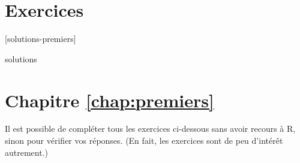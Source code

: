 \section{Exercices}
\label{sec:premiers:exercices}

[solutions-premiers]

\begin{Filesave}{solutions}
\section*{Chapitre \ref*{chap:premiers}}

\end{Filesave}

Il est possible de compléter tous les exercices ci-dessous sans avoir
recours à R, sinon pour vérifier vos réponses. (En fait, les exercices
sont de peu d'intérêt autrement.)

